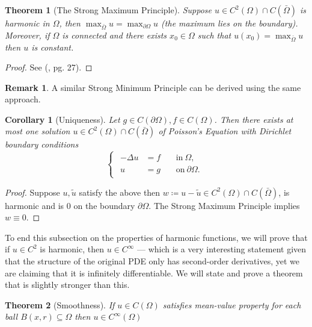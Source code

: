 \documentclass[openany, amssymb, psamsfonts]{amsart}
\newtheorem{thm}{Theorem}[section]
\newtheorem{cor}{Corollary}[section]
\theoremstyle{definition}
\newtheorem{rem}{Remark}[section]
\numberwithin{equation}{section}
\begin{document}
\begin{thm} [The Strong Maximum Principle]
    Suppose $u \in C^2(\Omega) \cap C(\bar{\Omega})$ is harmonic in $\Omega$, then $\max_{\bar{\Omega}} u = \max_{\partial \Omega} u$ (the maximum lies on the boundary). Moreover, if $\Omega$ is connected and there exists $x_0 \in \Omega$ such that $u(x_0) = \max_{\bar{\Omega}} u$ then $u$ is constant.
\end{thm}

\begin{proof}
See (\cite{Evans}, pg. 27).
\end{proof}
\begin{rem}
A similar Strong Minimum Principle can be derived using the same approach.
\end{rem}

\begin{cor} [Uniqueness]
Let $g \in C(\partial \Omega), f \in C(\Omega)$. Then there exists at most one solution $u \in C^2(\Omega) \cap C(\bar{\Omega})$ of Poisson's Equation with Dirichlet boundary conditions 
\begin{equation} \label{poisson_dirichlet}
    \begin{cases}
        \begin{aligned}
            -\Delta u &= f &&\:\text{in}\:  \Omega , \\
            u &= g &&\:\text{on}\: \partial \Omega .
        \end{aligned}
    \end{cases}
\end{equation}
\end{cor}
\begin{proof}
    Suppose $u, \tilde{u}$ satisfy the above then $w \coloneqq u - \tilde{u} \in C^2(\Omega) \cap C(\bar{\Omega})$, is harmonic and is 0 on the boundary $\partial \Omega$. The Strong Maximum Principle implies $w \equiv 0$.
\end{proof}

To end this subsection on the properties of harmonic functions, we will prove that if $u \in C^2$ is harmonic, then $u \in C^\infty$ --- which is a very interesting statement given that the structure of the original PDE only has second-order derivatives, yet we are claiming that it is infinitely differentiable. We will state and prove a theorem that is slightly stronger than this.
\begin{thm} [Smoothness]
    If $u \in C(\Omega)$ satisfies mean-value property for each ball $B(x, r) \subseteq \Omega$ then $u \in C^{\infty} (\Omega)$ 
\end{thm}
\end{document}

